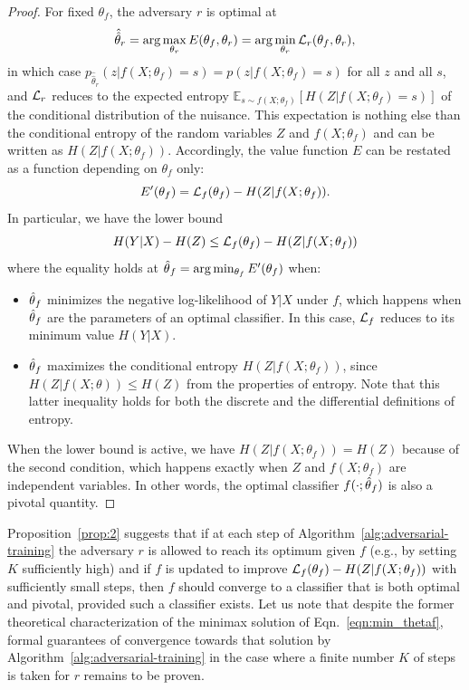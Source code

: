 \documentclass[twocolumn,superscriptaddress,aps]{revtex4-1}
\theoremstyle{plain}
\begin{document}
\begin{proof}

For fixed $\theta_f$, the adversary $r$ is optimal at $$\hat{\hat\theta}_r = \arg
\max_{\theta_r} E(\theta_f, \theta_r)  = \arg \min_{\theta_r} {\cal
L}_r(\theta_f, \theta_r),$$ in which case $p_{\hat{\hat\theta}_r}(z|f(X;\theta_f)=s) =
p(z|f(X;\theta_f)=s)$ for all $z$ and all $s$, and ${\cal L}_r$ reduces to the expected entropy
$\mathbb{E}_{s \sim f(X;\theta_f)} [ H({Z|f(X;\theta_f)=s}) ]$ of the conditional distribution of the nuisance.
This expectation is nothing else than the conditional entropy of the random variables
$Z$ and $f(X;\theta_f)$ and can be written as $H(Z|f(X;\theta_f))$.
Accordingly, the
value function $E$ can be restated as a function depending on $\theta_f$ only: $$E'(\theta_f) = {\cal
L}_f(\theta_f) -  H({Z|f(X;\theta_f)}).$$  In particular, we have the lower
bound $$H({Y|X}) - H(Z) \leq {\cal L}_f(\theta_f) - H({Z|f(X;\theta_f)})$$
where the equality holds at $\smash{\hat\theta}_f = \arg \min_{\theta_f}
E'(\theta_f)$  when:
\begin{itemize}
    \item $\smash{\hat\theta}_f$ minimizes the negative log-likelihood of $Y|X$ under $f$,
    which happens when $\smash{\hat\theta}_f$ are the parameters
    of an optimal classifier. In this case, ${\cal L}_f$ reduces to its
    minimum value $H({Y|X})$.

    \item $\smash{\hat\theta}_f$ maximizes the conditional entropy
    $H({Z|f(X;\theta_f)})$, since $H(Z|f(X;\theta)) \leq H(Z)$ from the properties of entropy. Note that this
    latter inequality holds for both the discrete and the differential definitions of entropy.
\end{itemize}
When the lower bound is active, we have $H(Z|f(X;\theta_f)) = H(Z)$
because of the second condition, which happens exactly when $Z$ and $f(X;\theta_f)$
are independent variables. In other words,  the
optimal classifier $f(\cdot;\smash{\hat\theta}_f)$ is also a pivotal
quantity.

\end{proof}

Proposition~\ref{prop:2} suggests that if at each step of
Algorithm~\ref{alg:adversarial-training} the adversary $r$ is allowed to reach
its optimum given $f$ (e.g., by setting $K$ sufficiently high) and if $f$ is
updated to improve ${\cal L}_f(\theta_f) -  H({Z|f(X;\theta_f)})$ with
sufficiently small steps, then $f$ should converge to a classifier that is both
optimal and pivotal, provided such a classifier exists. Let us note
that despite the former theoretical characterization of the minimax solution
of Eqn.~\ref{eqn:min_thetaf}, formal guarantees of
convergence towards that solution by
Algorithm~\ref{alg:adversarial-training} in the case where a finite number $K$
of steps is taken for $r$ remains to be proven.
\end{document}

